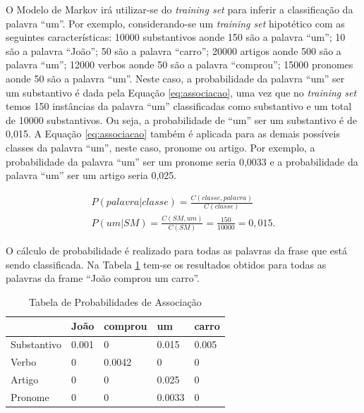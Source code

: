 O Modelo de Markov irá utilizar-se do \textit{training set} para inferir a
classificação da palavra ``um''. Por exemplo, considerando-se um
\textit{training set} hipotético com as seguintes características: 10000
substantivos aonde 150 são a palavra ``um''; 10
são a palavra ``João''; 50 são a palavra ``carro''; 20000 artigos aonde 500 são
a palavra ``um''; 12000 verbos aonde 50 são a palavra ``comprou''; 15000
pronomes aonde 50 são a palavra ``um''. Neste caso, a probabilidade da palavra
``um'' ser um substantivo é dada pela Equação \ref{eq:associacao}, uma vez que
no \textit{training set} temos 150 instâncias da palavra ``um'' classificadas como
substantivo e um total de 10000 substantivos. Ou seja, a probabilidade de ``um'' ser um substantivo é
de 0,015. A Equação \ref{eq:associacao} também é aplicada para as demais
possíveis classes da palavra ``um'', neste caso, pronome ou artigo. Por exemplo, a
probabilidade da palavra ``um'' ser um pronome seria 0,0033 e a probabilidade da palavra ``um'' ser um artigo seria 0,025. 

\begin{equation}
\begin{split}
P(palavra|classe) = \frac{C(classe,palavra)}{C(classe)}  \\
P(um|SM) = \frac{C(SM,um)}{C(SM)} = \frac{150}{10000} = 0,015.
\end{split}
\label{eq:associacao}
\end{equation}

O
cálculo de probabilidade é realizado para todas as palavras da frase que está
sendo classificada. Na Tabela \ref{tabela:associacao} tem-se os resultados
obtidos para todas as palavras da frame ``João comprou um carro''.

\begin{table}[htb]
\centering
\begin{tabular}{|l|l|l|l|l|}
\hline
& João  & comprou & um     & carro  \\ \hline
Substantivo & 0.001 & 0       & 0.015  & 0.005  \\ \hline
Verbo       & 0     & 0.0042  & 0      & 0      \\ \hline
Artigo      & 0     & 0       & 0.025  & 0      \\ \hline
Pronome     & 0     & 0       & 0.0033 & 0      \\ \hline
\end{tabular}
\caption{Tabela de Probabilidades de Associação}
\label{tabela:associacao}
\end{table}


